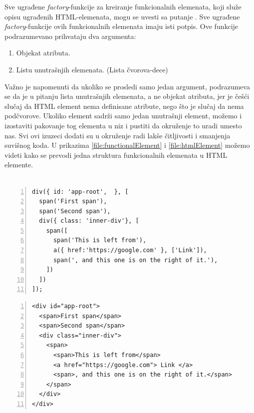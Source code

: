 \documentclass[12pt,oneside]{memoir}
\newcommand{\code}[1]{\colorbox{codegray}{\texttt{\scalebox{0.9}{#1}}}}%
\begin{document}
Sve ugrađene \emph{factory}-funkcije za kreiranje funkcionalnih elemenata, koji služe opisu ugrađenih HTML-elemenata, mogu se uvesti sa putanje \code{"pure-framework/html"}.
Sve ugrađene \emph{factory}-funkcije ovih funkcionalnih elemenata imaju isti potpis.
Ove funkcije podrazumevano prihvataju dva argumenta:
\begin{enumerate}
  \item Objekat atributa. \label{enum:attr-list}
  \item Listu unutrašnjih elemenata. (Lista čvorova-dece)
\end{enumerate}
Važno je napomenuti da ukoliko se prosledi samo jedan argument, podrazumeva se da je u pitanju lista unutrašnjih elemenata,
a ne objekat atributa, jer je češći slučaj da HTML element nema definisane atribute, nego što je slučaj da nema podčvorove.
Ukoliko element sadrži samo jedan unutrašnji element, možemo i izostaviti pakovanje tog elementa u niz i pustiti da okruženje
to uradi umesto nas.
Svi ovi izuzeci dodati su u okruženje radi lakše čitljivosti i smanjenja suvišnog koda. U prikazima \ref{file:functionalElement} i \ref{file:htmlElement}
možemo videti kako se prevodi jedna
struktura funkcionalnih elemenata u HTML elemente.
\\
\\
\noindent\begin{minipage}[b]{.46\textwidth}
\begin{lstlisting}[style=jsStyle, numbers=left, numberstyle=\tiny, caption={Funkcionalni element},label=file:functionalElement]
div({ id: 'app-root',  }, [
  span('First span'),
  span('Second span'),
  div({ class: 'inner-div'}, [
    span([
      span('This is left from'),
      a({ href:'https://google.com' }, ['Link']),
      span(', and this one is on the right of it.'),
    ])
  ])
]);
\end{lstlisting}
\end{minipage}
\hfill
\begin{minipage}[b]{.46\textwidth}
\begin{lstlisting}[style=htmlStyle, numbers=left, numberstyle=\tiny, caption={Rezultujući HTML},label=file:htmlElement]
<div id="app-root">
  <span>First span</span>
  <span>Second span</span>
  <div class="inner-div">
    <span>
      <span>This is left from</span>
      <a href="https://google.com"> Link </a>
      <span>, and this one is on the right of it.</span>
    </span>
  </div>
</div>
\end{lstlisting}
\end{minipage}
\end{document}
